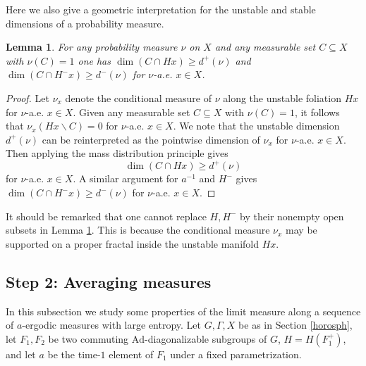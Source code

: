 \documentclass[reqno,12pt]{amsart}
\newtheorem{lemma}[theorem]{Lemma}
\theoremstyle{definition}
\numberwithin{equation}{section}
\newcommand{\NN}{\mathbb{N}}
\newcommand{\Ad}{\mathrm{Ad}}
\renewcommand{\setminus}{\smallsetminus}
\begin{document}
{Here we also give a geometric interpretation for the unstable and stable dimensions of a probability measure.

\begin{lemma}\label{L:localdim}
For any probability measure $\nu$ on $X$ and  any measurable set $C\subseteq X$ with $\nu(C)=1$ 
one has $\dim(C\cap Hx)\geq d^+(\nu)$ and $\dim(C\cap H^-x)\geq d^-(\nu)$ for $\nu$-a.e. $x\in X$.
\end{lemma}
\begin{proof}
Let $\nu_x$ denote the conditional measure of $\nu$ along the unstable foliation $Hx$ for $\nu$-a.e. $x\in X$. Given any measurable set $C\subseteq X$ with $\nu(C)=1$, it follows that $\nu_x(Hx\setminus C)=0$ for $\nu$-a.e. $x\in X$. 
        We note that the unstable dimension $d^+(\nu)$ can be reinterpreted as the pointwise dimension of $\nu_x$ for $\nu$-a.e. $x\in X$. Then %
        applying the mass distribution principle gives $$\dim(C\cap Hx)\geq d^+(\nu) $$ for $\nu$-a.e. $x\in X$. A similar argument for $a^{-1}$ and $H^-$ gives $\dim(C\cap H^-x)\geq d^-(\nu)$ for $\nu$-a.e. $x\in X$.
\end{proof}

It should be remarked that one cannot replace $H,H^-$ by their nonempty open subsets in Lemma \ref{L:localdim}. This is because the conditional measure $\nu_x$ may be supported on a proper fractal inside the unstable manifold $Hx$.

\subsection{Step 2: Averaging measures} In this subsection we study some properties of the limit measure along a sequence of $a$-ergodic measures with large entropy. Let $G,\Gamma,X$ {be} as in Section \ref{horosph}, {let} $F_1,F_2$ be two commuting $\Ad$-diagonalizable subgroups of $G$, $H=H(F_1^+)$, and {let} $a$ be the time-$1$ element of $F_1$ under a fixed parametrization.


}
\end{document}
